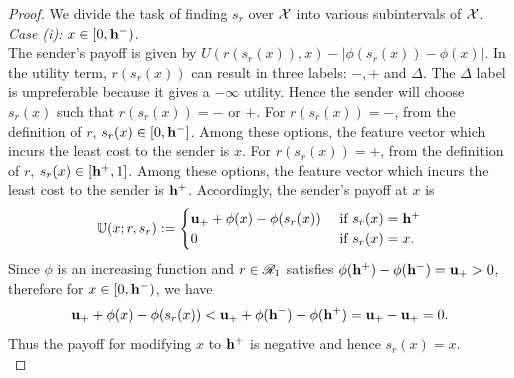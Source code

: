 \begin{proof}\label{proof:Best response r1}
    We divide the task of finding $s_r$ over $\mathcal{X}$ into various subintervals of $\mathcal{X}$.\\
\noindent \textit{Case (i): }{$x \in [0, \mathbf{h^{-}})$.}\\ The sender's payoff is given by $U(r(s_r(x)),x) - |\phi(s_r(x))-\phi(x)|$.
	In the utility term, $r(s_r(x))$ can result in three labels: $\minus, \plus$ and $\Delta$. The $\Delta$ label is unpreferable because it gives a $-\infty$ utility.
	Hence the sender will choose $s_r(x)$ such that $r(s_r(x)) = \minus$ or $ \plus$.
	For $r(s_r(x)) = \minus$, from the definition of $r$, $s_r(x) \in [0,\mathbf{h^{-}}]$. Among these options, the feature vector which incurs the least cost to the sender is $x$.
	For $r(s_r(x)) = \plus$, from the definition of $r$, $s_r(x) \in [\mathbf{h^{+}},1]$. Among these options, the feature vector which incurs the least cost to the sender is $\mathbf{h^{+}}$.
	Accordingly, the sender's payoff at $x$ is
		\[\mathbb{U}(x;r,s_r) := \begin{cases}
			\mathbf{u_+} + \phi(x) - \phi(s_r(x)) & \text{ if } s_r(x)= \mathbf{h^{+}} \\
			0& \text{ if }s_r(x) = x.\\
		\end{cases}\]
	 Since $\phi$ is an increasing function and $r \in \mathscr{R}_1$ satisfies $\phi(\mathbf{h^{+}}) - \phi(\mathbf{h^{-}}) = \mathbf{u_+} > 0$, therefore for $x \in [0, \mathbf{h^{-}})$, we have $$\mathbf{u_+} + \phi(x) - \phi(s_r(x))  < \mathbf{u_+} + \phi(\mathbf{h^{-}}) - \phi(\mathbf{h^{+}}) = \mathbf{u_+} -\mathbf{u_+}  = 0.$$ Thus the payoff for modifying $x$ to $\mathbf{h^{+}}$ is negative and hence $s_r(x) = x$.\\


\end{proof}

